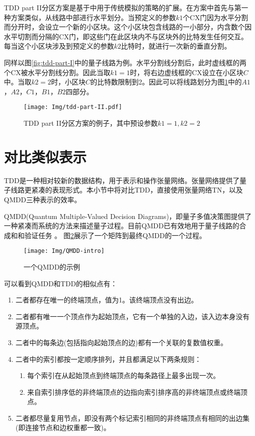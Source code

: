 TDD part II分区方案是基于\citep{huang2020classical}中用于传统模拟的策略的扩展。在方案中首先与第一种方案类似，从线路中部进行水平划分。当预定义的参数$k1$个CX门因为水平分割而分开时，会设立一个新的小区块。这个小区块包含线路的一小部分，内含数个因水平切割而分隔的CX门，即这些门在此区块内不与区块外的比特发生任何交互。每当这个小区块涉及到预定义的参数$k2$比特时，就进行一次新的垂直分割。
\begin{example}
    同样以图\ref{fig:tdd-part-I}中的量子线路为例。水平分割线分割后，此时虚线框的两个CX被水平分割线分割。因此当取\(k1=1\)时，将右边虚线框的CX设立在小区块\(C\)中。当取\(k2=2\)时，小区块\(C\)的比特数限制到2。因此可以将线路划分为图\ref{fig:tdd-part-II}中的\(A1\)，\(A2\)，\(C1\)，\(B1\)，\(B2\)四部分。
\begin{figure}[!htbp]
    \centering
    \texttt{[image: Img/tdd-part-II.pdf]}
    \caption{TDD part II分区方案的例子，其中预设参数\(k1=1,k2=2\)}
    \label{fig:tdd-part-II}
\end{figure}
\end{example}
\section{对比类似表示}
\label{sec-compare}
TDD是一种相对较新的数据结构，用于表示和操作张量网络。张量网络提供了量子线路更紧凑的表现形式。本小节中将对比TDD，直接使用张量网络TN，以及QMDD\citep{1623982}三种表示的效率。

QMDD(Quantum Multiple-Valued Decision Diagrams)，即量子多值决策图提供了一种紧凑而系统的方法来描述量子过程。目前QMDD已有效地用于量子线路的合成\citep{niemann2020advanced}和和验证任务
\citep{burgholzer2020verifying,burgholzer2020advanced}。
图\ref{fig:qmdd-basic}展示了一个矩阵到最终QMDD的一个过程。
\begin{figure}[htbp]
    \centering
    \texttt{[image: Img/QMDD-intro]}
    \caption{一个QMDD的示例}
    \label{fig:qmdd-basic}
\end{figure}

可以看到QMDD和TDD的相似点有：
\begin{enumerate}
    \item 二者都存在唯一的终端顶点，值为1。该终端顶点没有出边。
    \item 二者都有唯一一个顶点作为起始顶点，它有一个单独的入边，该入边本身没有源顶点。
    \item 二者中的每条边(包括指向起始顶点的边)都有一个关联的复数值权重。
    \item 二者中的索引都按一定顺序排列，并且都满足以下两条规则：
    \begin{enumerate}[label=\roman*)]
        \item 每个索引在从起始顶点到终端顶点的每条路径上最多出现一次。
        \item 来自索引排序低的非终端顶点的边指向索引排序高的非终端顶点或终端顶点。
    \end{enumerate}
    \item 二者都尽量复用节点，即没有两个标记索引相同的非终端顶点有相同的出边集(即连接节点和边权重都一致)。
\end{enumerate}

